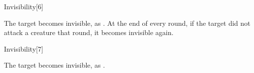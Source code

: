 \begin{spellsection}[Greater]{Invisibility}[6]
    \begin{spellheader}
    \end{spellheader}
    \begin{spellcontent}
        \begin{spelltargetinginfo}
        \end{spelltargetinginfo}
        \begin{spelleffects}
            \spelleffect The target becomes invisible, as . At the end of every round, if the target did not attack a creature that round, it becomes invisible again.
            \spelldur \durshort \dismissable
        \end{spelleffects}
    \end{spellcontent}
    \begin{spellfooter}
        \miscastrandom
    \end{spellfooter}
\end{spellsection}

\begin{spellsection}[Mass]{Invisibility}[7]
    \begin{spellheader}
    \end{spellheader}
    \begin{spellcontent}
        \begin{spelltargetinginfo}
        \end{spelltargetinginfo}
        \begin{spelleffects}
            \spelleffect The target becomes invisible, as .
            \spelldur \durshort \dismissable
        \end{spelleffects}
    \end{spellcontent}
    \begin{spellfooter}
        \miscastexplode
    \end{spellfooter}
\end{spellsection}

